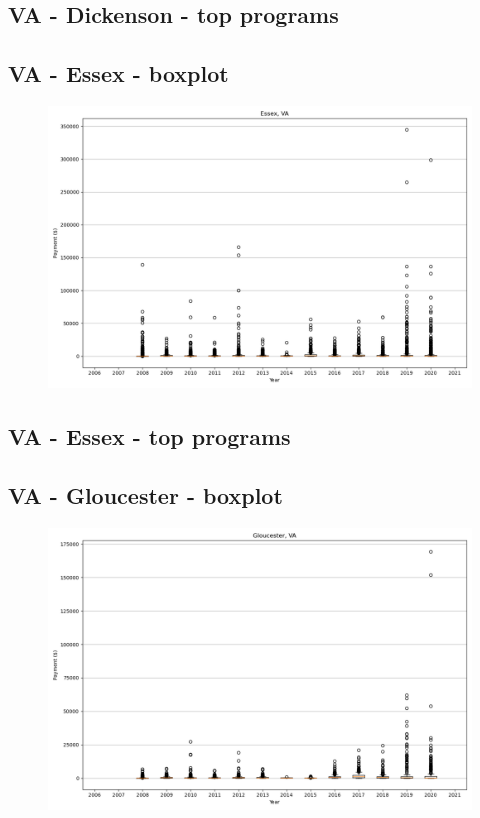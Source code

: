 \subsection*{VA - Dickenson - top programs}

\newpage
\subsection*{VA - Essex - boxplot}
\begin{figure}[h]
\centering
\includegraphics[width=7in]{../output/boxplots/counties/Essex-VA_boxplot.png}
\end{figure}


\subsection*{VA - Essex - top programs}

\newpage
\subsection*{VA - Gloucester - boxplot}
\begin{figure}[h]
\centering
\includegraphics[width=7in]{../output/boxplots/counties/Gloucester-VA_boxplot.png}
\end{figure}


